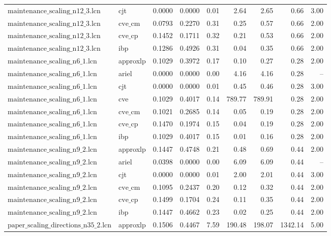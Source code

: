 \documentclass{article}
\begin{document}
\begin{table}[ht]
\begin{tabular}{llrrrrrrr}
$\text{maintenance\_scaling\_n12\_3.lcn}$ & cjt & 0.0000 & 0.0000 & 0.01 & 2.64 & 2.65 & 0.66 & 3.00 \\
$\text{maintenance\_scaling\_n12\_3.lcn}$ & $\text{cve\_cm}$ & 0.0793 & 0.2270 & 0.31 & 0.25 & 0.57 & 0.66 & 2.00 \\
$\text{maintenance\_scaling\_n12\_3.lcn}$ & $\text{cve\_cp}$ & 0.1452 & 0.1711 & 0.32 & 0.21 & 0.53 & 0.66 & 2.00 \\
$\text{maintenance\_scaling\_n12\_3.lcn}$ & ibp & 0.1286 & 0.4926 & 0.31 & 0.04 & 0.35 & 0.66 & 2.00 \\
\hline
$\text{maintenance\_scaling\_n6\_1.lcn}$ & approxlp & 0.1029 & 0.3972 & 0.17 & 0.10 & 0.27 & 0.28 & 2.00 \\
$\text{maintenance\_scaling\_n6\_1.lcn}$ & ariel & 0.0000 & 0.0000 & 0.00 & 4.16 & 4.16 & 0.28 & -- \\
$\text{maintenance\_scaling\_n6\_1.lcn}$ & cjt & 0.0000 & 0.0000 & 0.01 & 0.45 & 0.46 & 0.28 & 3.00 \\
$\text{maintenance\_scaling\_n6\_1.lcn}$ & cve & 0.1029 & 0.4017 & 0.14 & 789.77 & 789.91 & 0.28 & 2.00 \\
$\text{maintenance\_scaling\_n6\_1.lcn}$ & $\text{cve\_cm}$ & 0.1021 & 0.2685 & 0.14 & 0.05 & 0.19 & 0.28 & 2.00 \\
$\text{maintenance\_scaling\_n6\_1.lcn}$ & $\text{cve\_cp}$ & 0.1470 & 0.1974 & 0.15 & 0.04 & 0.19 & 0.28 & 2.00 \\
$\text{maintenance\_scaling\_n6\_1.lcn}$ & ibp & 0.1029 & 0.4017 & 0.15 & 0.01 & 0.16 & 0.28 & 2.00 \\
\hline
$\text{maintenance\_scaling\_n9\_2.lcn}$ & approxlp & 0.1447 & 0.4748 & 0.21 & 0.48 & 0.69 & 0.44 & 2.00 \\
$\text{maintenance\_scaling\_n9\_2.lcn}$ & ariel & 0.0398 & 0.0000 & 0.00 & 6.09 & 6.09 & 0.44 & -- \\
$\text{maintenance\_scaling\_n9\_2.lcn}$ & cjt & 0.0000 & 0.0000 & 0.01 & 2.00 & 2.01 & 0.44 & 3.00 \\
$\text{maintenance\_scaling\_n9\_2.lcn}$ & $\text{cve\_cm}$ & 0.1095 & 0.2437 & 0.20 & 0.12 & 0.32 & 0.44 & 2.00 \\
$\text{maintenance\_scaling\_n9\_2.lcn}$ & $\text{cve\_cp}$ & 0.1499 & 0.1704 & 0.24 & 0.11 & 0.35 & 0.44 & 2.00 \\
$\text{maintenance\_scaling\_n9\_2.lcn}$ & ibp & 0.1447 & 0.4662 & 0.23 & 0.02 & 0.25 & 0.44 & 2.00 \\
\hline
$\text{paper\_scaling\_directions\_n35\_2.lcn}$ & approxlp & 0.1506 & 0.4467 & 7.59 & 190.48 & 198.07 & 1342.14 & 5.00 \\

\end{tabular}
\end{table}
\end{document}
